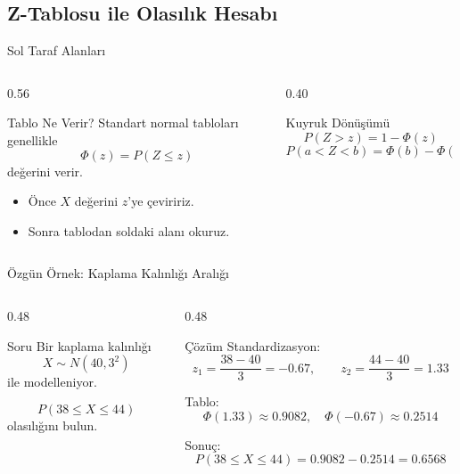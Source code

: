 \documentclass[light]{lutbeamer}
\begin{document}
\subsection{Z-Tablosu ile Olasılık Hesabı}

\begin{frame}{Sol Taraf Alanları}
\small
\begin{columns}[T,onlytextwidth]
    \begin{column}{0.56\textwidth}
        \begin{block}{Tablo Ne Verir?}
            Standart normal tabloları genellikle
            \[
            \Phi(z)=P(Z \le z)
            \]
            değerini verir.
        \end{block}

        \begin{itemize}
            \item Önce $X$ değerini $z$'ye çeviririz.
            \item Sonra tablodan soldaki alanı okuruz.
        \end{itemize}
    \end{column}
    \begin{column}{0.40\textwidth}
        \begin{exampleblock}{Kuyruk Dönüşümü}
            \[
            P(Z>z)=1-\Phi(z)
            \]
            \[
            P(a<Z<b)=\Phi(b)-\Phi(a)
            \]
        \end{exampleblock}
    \end{column}
\end{columns}
\end{frame}

\begin{frame}{Özgün Örnek: Kaplama Kalınlığı Aralığı}
\small
\begin{columns}[T,onlytextwidth]
    \begin{column}{0.48\textwidth}
        \begin{block}{Soru}
            Bir kaplama kalınlığı
            \[
            X \sim N(40,3^2)
            \]
            ile modelleniyor.

            \vspace{0.15cm}
            \[
            P(38 \le X \le 44)
            \]
            olasılığını bulun.
        \end{block}
    \end{column}
    \begin{column}{0.48\textwidth}
        \begin{exampleblock}{Çözüm}
            Standardizasyon:
            \[
            z_1=\frac{38-40}{3}=-0.67,\qquad
            z_2=\frac{44-40}{3}=1.33
            \]

            Tablo:
            \[
            \Phi(1.33)\approx 0.9082,\quad \Phi(-0.67)\approx 0.2514
            \]

            Sonuç:
            \[
            P(38 \le X \le 44)=0.9082-0.2514=0.6568
            \]
        \end{exampleblock}
    \end{column}
\end{columns}
\end{frame}
\end{document}
